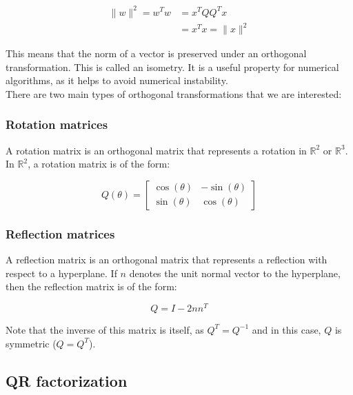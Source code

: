 \begin{equation}
    \begin{aligned}
        \|w\|^2 =w^T w &= x^T Q Q^T x \\
        &= x^T x = \|x\|^2
    \end{aligned}
\end{equation}

This means that the norm of a vector is preserved under an orthogonal transformation. This is called an isometry. It is
a useful property for numerical algorithms, as it helps to avoid numerical instability.\\

There are two main types of orthogonal transformations that we are interested:

\subsubsection{Rotation matrices}

A rotation matrix is an orthogonal matrix that represents a rotation in $\mathbb{R}^2$ or $\mathbb{R}^3$. In $\mathbb{R}^2$,
a rotation matrix is of the form:

\begin{equation}
    Q(\theta) = \begin{bmatrix}
        \cos(\theta) & -\sin(\theta) \\
        \sin(\theta) & \cos(\theta)
    \end{bmatrix}
\end{equation}

\subsubsection{Reflection matrices}

A reflection matrix is an orthogonal matrix that represents a reflection with respect to a hyperplane. If $n$ denotes
the unit normal vector to the hyperplane, then the reflection matrix is of the form:

\begin{equation}
    Q = I - 2 n n^T
\end{equation}

Note that the inverse of this matrix is itself, as $Q^T = Q^{-1}$ and in this case, $Q$ is symmetric ($Q = Q^T$).\\

\subsection{QR factorization}

